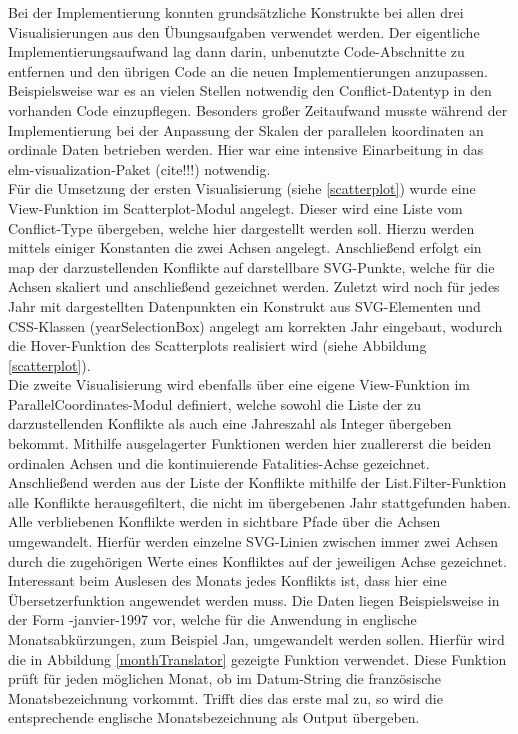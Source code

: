 \documentclass[usegeometry=true]{scrartcl}
\begin{document}
Bei der Implementierung konnten grundsätzliche Konstrukte bei allen drei Visualisierungen aus den Übungsaufgaben verwendet werden. Der eigentliche Implementierungsaufwand lag dann darin, unbenutzte Code-Abschnitte zu entfernen und den übrigen Code an die neuen Implementierungen anzupassen. Beispielsweise war es an vielen Stellen notwendig den Conflict-Datentyp in den vorhanden Code einzupflegen. Besonders großer Zeitaufwand musste während der Implementierung bei der Anpassung der Skalen der parallelen koordinaten an ordinale Daten betrieben werden. Hier war eine intensive Einarbeitung in das elm-visualization-Paket (cite!!!) notwendig.\\

Für die Umsetzung der ersten Visualisierung (siehe \ref{scatterplot}) wurde eine View-Funktion im Scatterplot-Modul angelegt. Dieser wird eine Liste vom Conflict-Type übergeben, welche hier dargestellt werden soll. Hierzu werden mittels einiger Konstanten die zwei Achsen angelegt. Anschließend erfolgt ein map der darzustellenden Konflikte auf darstellbare SVG-Punkte, welche für die Achsen skaliert und anschließend gezeichnet werden. Zuletzt wird noch für jedes Jahr mit dargestellten Datenpunkten ein Konstrukt aus SVG-Elementen und CSS-Klassen (\glqq yearSelectionBox\grqq) angelegt am korrekten Jahr eingebaut, wodurch die Hover-Funktion des Scatterplots realisiert wird (siehe Abbildung \ref{scatterplot}).\\ 

Die zweite Visualisierung wird ebenfalls über eine eigene View-Funktion im ParallelCoordinates-Modul definiert, welche sowohl die Liste der zu darzustellenden Konflikte als auch eine Jahreszahl als Integer übergeben bekommt. Mithilfe ausgelagerter Funktionen werden hier zuallererst die beiden ordinalen Achsen und die kontinuierende \glqq Fatalities\grqq-Achse gezeichnet. Anschließend werden aus der Liste der Konflikte mithilfe der List.Filter-Funktion alle Konflikte herausgefiltert, die nicht im übergebenen Jahr stattgefunden haben. Alle verbliebenen Konflikte werden in sichtbare Pfade über die Achsen umgewandelt. Hierfür werden einzelne SVG-Linien zwischen immer zwei Achsen durch die zugehörigen Werte eines Konfliktes auf der jeweiligen Achse gezeichnet. Interessant beim Auslesen des Monats jedes Konflikts ist, dass hier eine Übersetzerfunktion angewendet werden muss. Die Daten liegen Beispielsweise in der Form -janvier-1997\grqq{} vor, welche für die Anwendung in englische Monatsabkürzungen, zum Beispiel \glqq Jan\grqq, umgewandelt werden sollen. Hierfür wird die in Abbildung \ref{monthTranslator} gezeigte Funktion verwendet. Diese Funktion prüft für jeden möglichen Monat, ob im Datum-String die französische Monatsbezeichnung vorkommt. Trifft dies das erste mal zu, so wird die entsprechende englische Monatsbezeichnung als Output übergeben.\\
\end{document}
